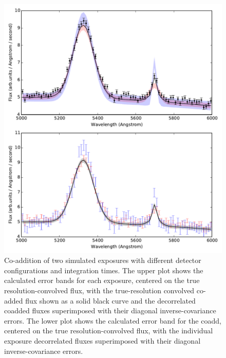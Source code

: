 \documentclass[12pt]{article}
\begin{document}
\begin{figure}[htb]
\begin{center}
\includegraphics[width=5in]{fig/stacked}
\caption{Co-addition of two simulated exposures with different detector configurations and integration times. The upper plot shows the calculated error bands for each exposure, centered on the true resolution-convolved flux, with the true-resolution convolved co-added flux shown as a solid black curve and the decorrelated coadded fluxes superimposed with their diagonal inverse-covariance errors. The lower plot shows the calculated error band for the coadd, centered on the true resolution-convolved flux, with the individual exposure decorrelated fluxes superimposed with their diagonal inverse-covariance errors.}
\label{fig:stacked}
\end{center}
\end{figure}
\end{document}
